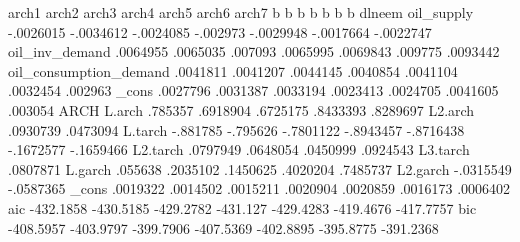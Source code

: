 	arch1	arch2	arch3	arch4	arch5	arch6	arch7
	b	b	b	b	b	b	b
dlneem							
oil_supply	-.0026015	-.0034612	-.0024085	-.002973	-.0029948	-.0017664	-.0022747
oil_inv_demand	.0064955	.0065035	.007093	.0065995	.0069843	.009775	.0093442
oil_consumption_demand	.0041811	.0041207	.0044145	.0040854	.0041104	.0032454	.002963
_cons	.0027796	.0031387	.0033194	.0023413	.0024705	.0041605	.003054
ARCH							
L.arch	.785357	.6918904	.6725175	.8433393	.8289697		
L2.arch						.0930739	.0473094
L.tarch	-.881785	-.795626	-.7801122	-.8943457	-.8716438	-.1672577	-.1659466
L2.tarch		.0797949	.0648054		.0450999		.0924543
L3.tarch			.0807871				
L.garch	.055638	.2035102	.1450625			.4020204	.7485737
L2.garch				-.0315549	-.0587365		
_cons	.0019322	.0014502	.0015211	.0020904	.0020859	.0016173	.0006402
aic	-432.1858	-430.5185	-429.2782	-431.127	-429.4283	-419.4676	-417.7757
bic	-408.5957	-403.9797	-399.7906	-407.5369	-402.8895	-395.8775	-391.2368
